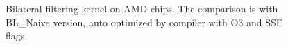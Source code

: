 \documentclass{IEEEtran}
\begin{document}
\begin{figure} 
\begin{centering} 
\end{centering}
\caption{Bilateral filtering kernel on AMD chips. The comparison is with BL\_Naive version, auto optimized by compiler with O3 and SSE flags.} 
\label{fig:comparisonAMD} 
\end{figure} 
\end{document}
